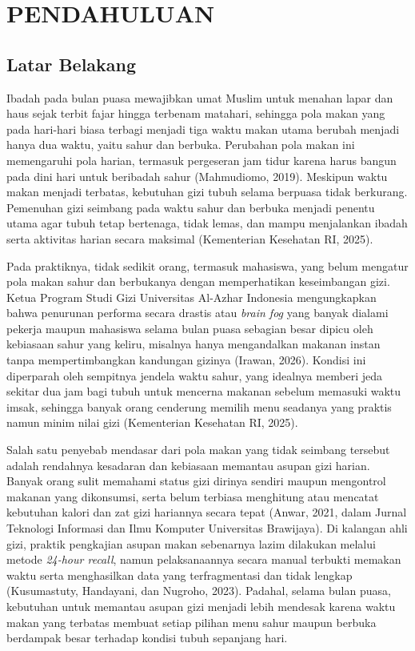 \cleardoublepage %
\chapter{PENDAHULUAN}
\label{chap:pendahuluan}
\section{Latar Belakang}
Ibadah pada bulan puasa mewajibkan umat Muslim untuk menahan lapar dan haus sejak terbit fajar hingga terbenam matahari, sehingga pola makan yang pada hari-hari biasa terbagi menjadi tiga waktu makan utama berubah menjadi hanya dua waktu, yaitu sahur dan berbuka. Perubahan pola makan ini memengaruhi pola harian, termasuk pergeseran jam tidur karena harus bangun pada dini hari untuk beribadah sahur (Mahmudiomo, 2019). Meskipun waktu makan menjadi terbatas, kebutuhan gizi tubuh selama berpuasa tidak berkurang. Pemenuhan gizi seimbang pada waktu sahur dan berbuka menjadi penentu utama agar tubuh tetap bertenaga, tidak lemas, dan mampu menjalankan ibadah serta aktivitas harian secara maksimal (Kementerian Kesehatan RI, 2025).

Pada praktiknya, tidak sedikit orang, termasuk mahasiswa, yang belum mengatur pola makan sahur dan berbukanya dengan memperhatikan keseimbangan gizi. Ketua Program Studi Gizi Universitas Al-Azhar Indonesia mengungkapkan bahwa penurunan performa secara drastis atau \emph{brain fog} yang banyak dialami pekerja maupun mahasiswa selama bulan puasa sebagian besar dipicu oleh kebiasaan sahur yang keliru, misalnya hanya mengandalkan makanan instan tanpa mempertimbangkan kandungan gizinya (Irawan, 2026). Kondisi ini diperparah oleh sempitnya jendela waktu sahur, yang idealnya memberi jeda sekitar dua jam bagi tubuh untuk mencerna makanan sebelum memasuki waktu imsak, sehingga banyak orang cenderung memilih menu seadanya yang praktis namun minim nilai gizi (Kementerian Kesehatan RI, 2025).

Salah satu penyebab mendasar dari pola makan yang tidak seimbang tersebut adalah rendahnya kesadaran dan kebiasaan memantau asupan gizi harian. Banyak orang sulit memahami status gizi dirinya sendiri maupun mengontrol makanan yang dikonsumsi, serta belum terbiasa menghitung atau mencatat kebutuhan kalori dan zat gizi hariannya secara tepat (Anwar, 2021, dalam Jurnal Teknologi Informasi dan Ilmu Komputer Universitas Brawijaya). Di kalangan ahli gizi, praktik pengkajian asupan makan sebenarnya lazim dilakukan melalui metode \emph{24-hour recall}, namun pelaksanaannya secara manual terbukti memakan waktu serta menghasilkan data yang terfragmentasi dan tidak lengkap (Kusumastuty, Handayani, dan Nugroho, 2023). Padahal, selama bulan puasa, kebutuhan untuk memantau asupan gizi menjadi lebih mendesak karena waktu makan yang terbatas membuat setiap pilihan menu sahur maupun berbuka berdampak besar terhadap kondisi tubuh sepanjang hari.

